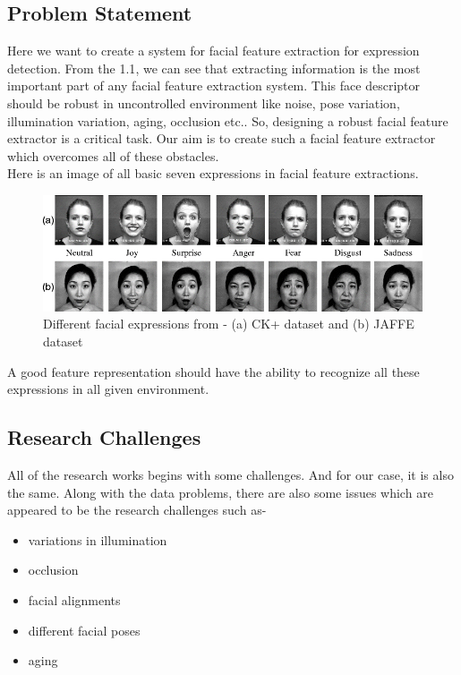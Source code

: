 \documentclass[12pt]{article}
\begin{document}
\subsection{Problem Statement}
\noindent Here we want to create a system for facial feature extraction for expression detection. From the \figurename{ 1.1}, we can see that extracting information is the most important part of any facial feature extraction system. This face descriptor
should be robust in uncontrolled environment like noise, pose variation, illumination variation, aging, occlusion etc.\cite{ldpPaper}. So, designing a robust facial feature extractor is a critical task. Our aim is to create such a facial feature extractor which overcomes all of these obstacles.\\
\linebreak
Here is an image of all basic seven expressions in facial feature extractions.\\
\begin{figure}[h]
	\centering
	\includegraphics[width=\textwidth]{CKp_JAFFE.png}
	\caption{Different facial expressions from - (a) CK+ dataset and (b) JAFFE dataset}
	\label{sixExpressions}
	
\end{figure} 

A good feature representation should have the ability to
recognize all these expressions in all given environment.
\subsection{Research Challenges}
\label{sec:sec01}

All of the research works begins with some challenges. And for our case, it is also the same. Along with the data problems, there are also some issues which are appeared to be the research challenges such as-
\begin{itemize}
	\item variations in illumination
	\item occlusion
	\item facial alignments
	\item different facial poses
	\item aging
\end{itemize}
\end{document}
